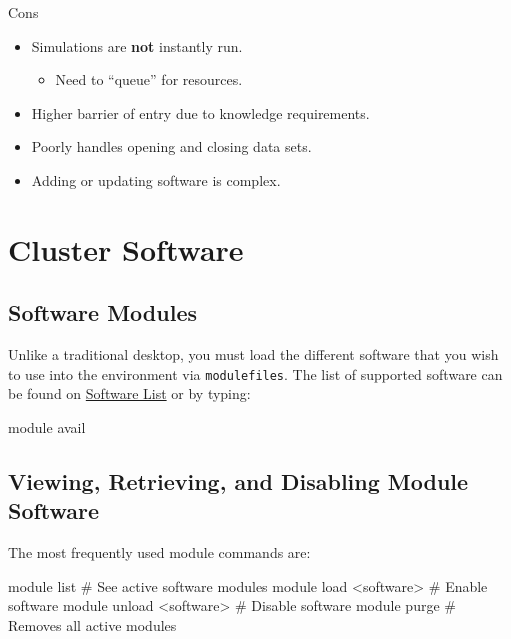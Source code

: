 \documentclass[
  letterpaper,
  DIV=11,
  numbers=noendperiod]{scrreport}
\newenvironment{Shaded}{\begin{snugshade}}{\end{snugshade}}
\newcommand{\CommentTok}[1]{\textcolor[rgb]{0.37,0.37,0.37}{#1}}
\newcommand{\ExtensionTok}[1]{\textcolor[rgb]{0.00,0.23,0.31}{#1}}
\newcommand{\NormalTok}[1]{\textcolor[rgb]{0.00,0.23,0.31}{#1}}
\newcommand{\OperatorTok}[1]{\textcolor[rgb]{0.37,0.37,0.37}{#1}}
\providecommand{\tightlist}{%
  \setlength{\itemsep}{0pt}\setlength{\parskip}{0pt}}\usepackage{longtable,booktabs,array}
\begin{document}
Cons

\begin{itemize}
\tightlist
\item
  Simulations are \textbf{not} instantly run.

  \begin{itemize}
  \tightlist
  \item
    Need to ``queue'' for resources.
  \end{itemize}
\item
  Higher barrier of entry due to knowledge requirements.
\item
  Poorly handles opening and closing data sets.
\item
  Adding or updating software is complex.
\end{itemize}

\hypertarget{cluster-software}{%
\chapter{Cluster Software}\label{cluster-software}}

\hypertarget{software-modules}{%
\section{Software Modules}\label{software-modules}}

Unlike a traditional desktop, you must load the different software that
you wish to use into the environment via \texttt{modulefiles}. The list
of supported software can be found on
\href{https://campuscluster.illinois.edu/resources/software/}{Software
List} or by typing:

\begin{Shaded}
\begin{Highlighting}[]
\ExtensionTok{module}\NormalTok{ avail}
\end{Highlighting}
\end{Shaded}

\hypertarget{viewing-retrieving-and-disabling-module-software}{%
\section{Viewing, Retrieving, and Disabling Module
Software}\label{viewing-retrieving-and-disabling-module-software}}

The most frequently used module commands are:

\begin{Shaded}
\begin{Highlighting}[]
\ExtensionTok{module}\NormalTok{ list              }\CommentTok{\# See active software modules}
\ExtensionTok{module}\NormalTok{ load }\OperatorTok{\textless{}}\NormalTok{software}\OperatorTok{\textgreater{}}\NormalTok{   \# Enable software}
\ExtensionTok{module}\NormalTok{ unload }\OperatorTok{\textless{}}\NormalTok{software}\OperatorTok{\textgreater{}}\NormalTok{ \# Disable software}
\ExtensionTok{module}\NormalTok{ purge             }\CommentTok{\# Removes all active modules}
\end{Highlighting}
\end{Shaded}
\end{document}

